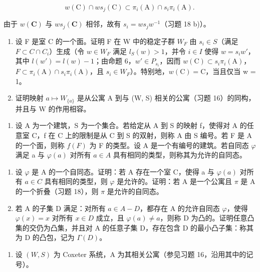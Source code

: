 \[
w (\mathrm{C}) \cap w s _ {j} (\mathrm{C}) \subset \pi_ {i} (\mathrm{A}) \cap s _ {i} \pi_ {i} (\mathrm{A}).
\]

由于 \(w(\mathbf{C})\) 与 \(ws_{j}(\mathbf{C})\) 相邻，故有 \(s_i = ws_jw^{-1}\)（习题 18 b)）。

\begin{enumerate}
\def\labelenumi{\alph{enumi})}
\setcounter{enumi}{2}
\item
  设 F 是室 C 的一个面。证明 F 在 W 中的稳定子群 \(W_{F}\) 由 \(s_{i} \in S\)（满足 \(F \subset C \cap C_{i}\)）生成（令 \(w \in W_{F}\) 满足 \(l_{S}(w) > 1\)，并令 \(i \in I\) 使得 \(w = s_{i}w'\)，其中 \(l(w') = l(w) - 1\)；由命题 6，\(w' \in P_{s_{i}}\)，因而 \(w(\mathrm{C}) \subset s_{i}\pi_{i}(\mathrm{A})\)，\(F \subset \pi_{i}(\mathrm{A}) \cap s_{i}\pi_{i}(\mathrm{A})\)，且 \(s_{i} \in W_{F}\)）。特别地，\(w(\mathrm{C}) = \mathrm{C}\)，当且仅当 w = 1。
\item
  证明映射 \(a \mapsto W_{\{a\}}\) 是从公寓 A 到与 (W, S) 相关的公寓（习题 16）的同构，并且与 W 的作用相容。
\end{enumerate}

\begin{enumerate}
\def\labelenumi{\arabic{enumi})}
\setcounter{enumi}{19}
\tightlist
\item
  设 A 为一个建筑，S 为一个集合。若给定从 A 到 S 的映射 f，使得对 A 的任意室 C，f 在 C 上的限制是从 C 到 S 的双射，则称 A 由 S 编号。若 F 是 A 的一个面，则称 \(f(F)\) 为 F 的类型。设 A 是一个有编号的建筑。若自同态 \(\varphi\) 满足 a 与 \(\varphi(a)\) 对所有 \(a \in A\) 具有相同的类型，则称其为允许的自同态。
\end{enumerate}

\begin{enumerate}
\def\labelenumi{\alph{enumi})}
\item
  设 \(\varphi\) 是 A 的一个自同态。证明：若 A 存在一个室 C，使得 a 与 \(\varphi(a)\) 对所有 \(a \in C\) 具有相同的类型，则 \(\varphi\) 是允许的。证明：若 A 是一个公寓且 \(\pi\) 是 A 的一个折叠（习题 18），则 \(\pi\) 是允许的自同态。
\item
  若 A 的子集 D 满足：对所有 \(a \in A - D\)，都存在 A 的允许自同态 \(\varphi\)，使得 \(\varphi(x) = x\) 对所有 \(x \in D\) 成立，且 \(\varphi(a) \neq a\)，则称 D 为凸的。证明任意凸集的交仍为凸集，并且对 A 的任意子集 D，存在包含 D 的最小凸子集：称其为 D 的凸包，记为 \(\Gamma(D)\)。
\end{enumerate}

\begin{enumerate}
\def\labelenumi{\arabic{enumi})}
\setcounter{enumi}{20}
\tightlist
\item
  设 \((W,S)\) 为 Coxeter 系统，A 为其相关公寓（参见习题 16，沿用其中的记号）。
\end{enumerate}

